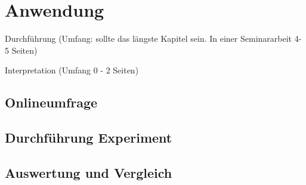 \newpage
\section{Anwendung} \label{praxis}
Durchführung (Umfang: sollte das längste Kapitel sein. In einer Seminararbeit 4-5 Seiten)

Interpretation (Umfang 0 - 2 Seiten)

\subsection{Onlineumfrage}

\subsection{Durchführung Experiment}

\subsection{Auswertung und Vergleich}
